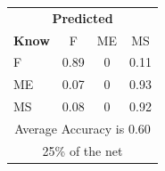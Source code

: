 \documentclass[12pt]{article} %
\begin{document}
\begin{minipage}{0.5\textwidth}
\begin{center}
\begin{tabular}{l|c|c|c|}
 \multicolumn{4}{c}{ \textbf{ Predicted}}\\
 \textbf{Know}&F&ME&MS\\ \hline\hline
F   &0.89&0&0.11\\
ME &0.07&0&0.93\\
MS &0.08&0&0.92\\
\multicolumn{4}{c}{Average Accuracy is 0.60}\\
\multicolumn{4}{c}{25\%  of the net}\\
\end{tabular}
\end{center}
\end{minipage}
\end{document}
